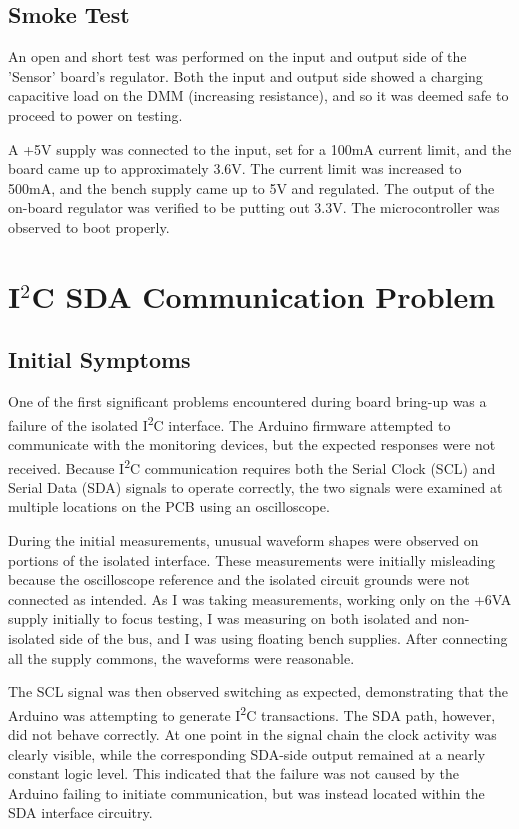 \subsection{Smoke Test}
An open and short test was performed on the input and output side of the 'Sensor' board's regulator. Both the input and output side showed a charging capacitive load on the DMM (increasing resistance), and so it was deemed safe to proceed to power on testing.

A +5V supply was connected to the input, set for a 100mA current limit, and the board came up to approximately 3.6V. The current limit was increased to 500mA, and the bench supply came up to 5V and regulated. The output of the on-board regulator was verified to be putting out 3.3V. The microcontroller was observed to boot properly.


\section{I\texorpdfstring{$^2$}{2}C SDA Communication Problem}
\label{sec:i2c-sda-bringup}

\subsection{Initial Symptoms}

One of the first significant problems encountered during board bring-up was a failure
of the isolated I\textsuperscript{2}C interface. The Arduino firmware attempted to
communicate with the monitoring devices, but the expected responses were not received.
Because I\textsuperscript{2}C communication requires both the Serial Clock (SCL) and
Serial Data (SDA) signals to operate correctly, the two signals were examined at
multiple locations on the PCB using an oscilloscope.

During the initial measurements, unusual waveform shapes were observed on portions
of the isolated interface. These measurements were initially misleading because the
oscilloscope reference and the isolated circuit grounds were not connected as
intended. As I was taking measurements, working only on the +6VA supply initially to focus testing, I was measuring on both isolated and non-isolated side of the bus, and I was using floating bench supplies. After connecting all the supply commons, the waveforms were reasonable.

The SCL signal was then observed switching as expected, demonstrating that the
Arduino was attempting to generate I\textsuperscript{2}C transactions. The SDA path,
however, did not behave correctly. At one point in the signal chain the clock activity
was clearly visible, while the corresponding SDA-side output remained at a nearly
constant logic level. This indicated that the failure was not caused by the Arduino
failing to initiate communication, but was instead located within the SDA interface
circuitry.

